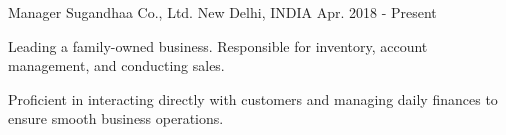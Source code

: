 
\begin{cventries}

  \cventry
    {Manager} %
    {Sugandhaa Co., Ltd.} %
    {New Delhi, INDIA} %
    {Apr. 2018 - Present} %
    {
      \begin{cvitems} %
      \item {Leading a family-owned business. Responsible for inventory, account management, and conducting sales.}
      \item {Proficient in interacting directly with customers and managing daily finances to ensure smooth business operations.}
      \end{cvitems}
    }


\end{cventries}
